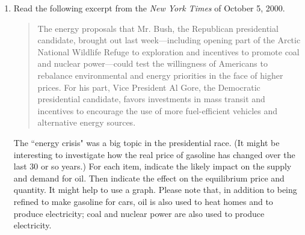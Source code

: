 \begin{enumerate}
\item Read the following excerpt from the \emph{New York Times} of October 5, 2000.

\begin{quote}
The energy proposals that Mr. Bush, the Republican presidential candidate, brought out last week---including opening part of the Arctic National Wildlife Refuge to exploration and incentives to promote coal and nuclear power---could test the willingness of Americans to rebalance environmental and energy priorities in the face of higher prices. For his part, Vice President Al Gore, the Democratic presidential candidate, favors investments in mass transit and incentives to encourage the use of more fuel-efficient vehicles and alternative energy sources.
\end{quote}
%
The ``energy crisis" was a big topic in the presidential race. (It might be interesting to investigate how the real price of gasoline has changed over the last 30 or so years.) For each item, indicate the likely impact on the supply and demand for oil. Then indicate the effect on the equilibrium price and quantity. It might help to use a graph. Please note that, in addition to being refined to make gasoline for cars, oil is also used to heat homes and to produce electricity; coal and nuclear power are also used to produce electricity.


\end{enumerate}
